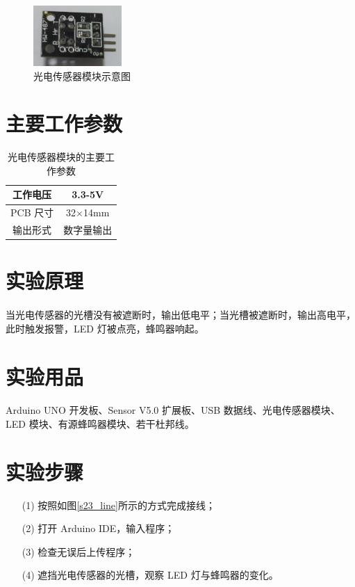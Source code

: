 \documentclass[UTF8, oneside]{ctexbook}
\begin{document}
\begin{figure}[h]
    \centering
    \includegraphics[width=0.3\textwidth]{./result/sensor/23/sensor.png}
    \caption{光电传感器模块示意图}
    \label{23_sensor}
\end{figure}

\section{主要工作参数}
\begin{table}[h]
    \centering
    \begin{tabular}{|c|c|}
    \hline
    工作电压   & 3.3-5V         \\ \hline
    PCB 尺寸 & 32$\times$14mm \\ \hline
    输出形式   & 数字量输出  \\ \hline
    \end{tabular}
    \caption{光电传感器模块的主要工作参数}
\end{table}

\section{实验原理}
\paragraph{}
当光电传感器的光槽没有被遮断时，输出低电平；当光槽被遮断时，输出高电平，
此时触发报警，LED 灯被点亮，蜂鸣器响起。

\section{实验用品}
\paragraph{}
Arduino UNO 开发板、Sensor V5.0 扩展板、USB 数据线、光电传感器模块、LED 模块、有源蜂鸣器模块、若干杜邦线。

\section{实验步骤}
\begin{itemize}
    \item[(1)] 按照如图\ref{s23_line}所示的方式完成接线；
    \item[(2)] 打开 Arduino IDE，输入程序；
    \item[(3)] 检查无误后上传程序；
    \item[(4)] 遮挡光电传感器的光槽，观察 LED 灯与蜂鸣器的变化。
\end{itemize}
\end{document}
